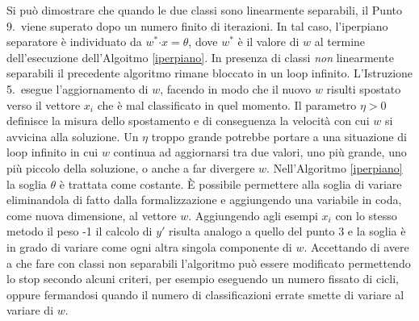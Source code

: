 \documentclass [11pt,a4paper,twoside,openright] {book}
\begin{document}
Si può dimostrare\cite{rosenblatt1958perceptron} che quando le due classi sono linearmente separabili, il Punto 9.\ viene superato dopo un numero finito di iterazioni. In tal caso, l'iperpiano separatore è individuato da $w^* \boldsymbol{ \cdot} x = \theta$, dove $w^*$ è il valore di $w$ al termine dell'esecuzione dell'Algoitmo \ref{iperpiano}. In presenza di classi \textit{non} linearmente separabili il precedente algoritmo rimane bloccato in un loop infinito.  L'Istruzione 5.\ esegue l'aggiornamento di $w$, facendo in modo che il nuovo $w$ risulti spostato verso il vettore $x_i$ che è mal classificato in quel momento. Il parametro $\eta > 0$ definisce la misura dello spostamento e di conseguenza la velocità con cui $w$ si avvicina alla soluzione. Un $\eta$ troppo grande potrebbe portare a una situazione di loop infinito in cui $w$ continua ad aggiornarsi tra due valori, uno più grande, uno più piccolo della soluzione, o anche a far divergere $w$. Nell'Algoritmo \ref{iperpiano} la soglia $\theta$ è trattata come costante. È possibile permettere alla soglia di variare eliminandola di fatto dalla formalizzazione e aggiungendo una variabile in coda, come nuova dimensione, al vettore $w$. Aggiungendo agli esempi $x_i$ con lo stesso metodo il peso -1 il calcolo di $y'$ risulta analogo a quello del punto 3 e la soglia è in grado di variare come ogni altra singola componente di $w$. Accettando di avere a che fare con classi non separabili l'algoritmo può essere modificato permettendo lo stop secondo alcuni criteri, per esempio eseguendo un numero fissato di cicli, oppure fermandosi quando il numero di classificazioni errate smette di variare al variare di $w$.
\end{document}
